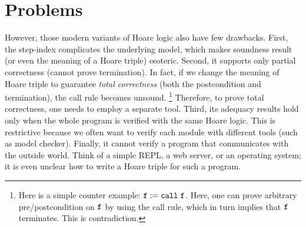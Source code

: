 \section{Problems}
\label{sec:program:problem}

However, those modern variants of Hoare logic also have few drawbacks.
First, the step-index complicates the underlying model, which makes soundness result (or even the meaning of a Hoare triple) esoteric.
Second, it supports only partial correctness (\ie cannot prove termination).
In fact, if we change the meaning of Hoare triple to guarantee {\it total correctness} (\ie both the postcondition and termination), the call rule becomes unsound.
\footnote{Here is a simple counter example: $\texttt{f} := \texttt{call} \; \texttt{f}$. Here, one can prove arbitrary pre/postcondition on $\texttt{f}$ by using the call rule, which in turn implies that $\texttt{f}$ terminates. This is contradiction.}
Therefore, to prove total correctness, one needs to employ a separate tool.
Third, its adequacy results hold only when the whole program is verified with the same Hoare logic.
This is restrictive because we often want to verify each module with different tools (such as model checker).
Finally, it cannot verify a program that communicates with the outside world. Think of a simple REPL, a web server, or an operating system; it is even unclear how to write a Hoare triple for such a program.
